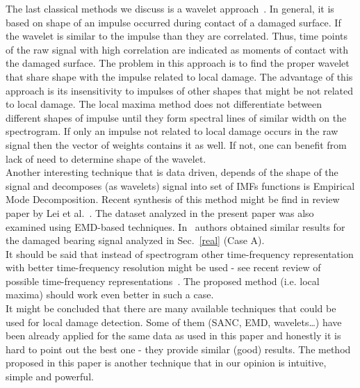 \documentclass[3p,times]{elsarticle}
\begin{document}
The last classical methods we discuss is a wavelet approach~\cite{WaveletReview}. In general, it is based on shape of an impulse occurred during contact of a damaged surface. If the wavelet is similar to the impulse than they are correlated. Thus, time points of the raw signal with high correlation are indicated as moments of contact with the damaged surface. The problem in this approach is to find the proper wavelet that share shape with the impulse related to local damage. The advantage of this approach is its insensitivity to impulses of other shapes that might be not related to local damage. The local maxima method does not differentiate between different shapes of impulse until they form spectral lines of similar width on the spectrogram. If only an impulse not related to local damage occurs in the raw signal then the vector of weights contains it as well. If not, one can benefit from lack of need to determine shape of the wavelet.\\
Another interesting technique that is data driven, depends of the shape of the signal and decomposes (as wavelets) signal into set of IMFs functions is Empirical Mode Decomposition. Recent synthesis of this method might be find in review paper by Lei et al.~\cite{EMDLei}. The dataset analyzed in the present paper was also examined using EMD-based techniques. In~\cite{EMDZimroz} authors obtained similar results for the damaged bearing signal analyzed in Sec.~\ref{real} (Case A).\\
It should be said that instead of spectrogram other time-frequency representation with better time-frequency resolution might be used - see recent review of possible time-frequency representations~\cite{TFReview}. The proposed method (i.e. local maxima) should work even better in such a case.\\
It might be concluded that there are many available techniques that could be used for local damage detection. Some of them (SANC, EMD, wavelets\ldots) have been already applied for the same data as used in this paper and honestly it is hard to point out the best one - they provide similar (good) results. The method proposed in this paper is another technique that in our opinion is intuitive, simple and powerful.
\end{document}
